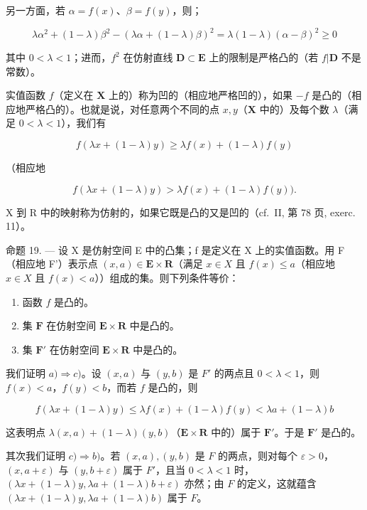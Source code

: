 另一方面，若 \(\alpha = f(x)\)、\(\beta = f(y)\)，则；

\[
\lambda \alpha^ {2} + (1 - \lambda) \beta^ {2} - (\lambda \alpha + (1 - \lambda) \beta) ^ {2} = \lambda (1 - \lambda) (\alpha - \beta) ^ {2} \geqslant 0
\]

其中 \(0 < \lambda < 1\)；进而，\(f^2\) 在仿射直线 \(\mathbf{D} \subset \mathbf{E}\) 上的限制是严格凸的（若 \(f|\mathbf{D}\) 不是常数）。

实值函数 \(f\)（定义在 \(\mathbf{X}\) 上的）称为凹的（相应地严格凹的），如果 \(-f\) 是凸的（相应地严格凸的）。也就是说，对任意两个不同的点 \(x, y\)（\(\mathbf{X}\) 中的）及每个数 \(\lambda\)（满足 \(0 < \lambda < 1\)），我们有

\[
f (\lambda x + (1 - \lambda) y) \geqslant \lambda f (x) + (1 - \lambda) f (y)
\]

（相应地

\[
f (\lambda x + (1 - \lambda) y) > \lambda f (x) + (1 - \lambda) f (y)).
\]

X 到 R 中的映射称为仿射的，如果它既是凸的又是凹的（cf.~II, 第 78 页, exerc. 11）。

命题 19. --- 设 X 是仿射空间 E 中的凸集；f 是定义在 X 上的实值函数。用 F（相应地 F'）表示点 \((x, a) \in \mathbf{E} \times \mathbf{R}\)（满足 \(x \in X\) 且 \(f(x) \leqslant a\)（相应地 \(x \in X\) 且 \(f(x) < a\)））组成的集。则下列条件等价：

\begin{enumerate}
\def\labelenumi{\alph{enumi})}
\item
  函数 \(f\) 是凸的。
\item
  集 \(\mathbf{F}\) 在仿射空间 \(\mathbf{E} \times \mathbf{R}\) 中是凸的。
\item
  集 \(\mathbf{F}'\) 在仿射空间 \(\mathbf{E} \times \mathbf{R}\) 中是凸的。
\end{enumerate}

我们证明 \(a) \Rightarrow c)\)。设 \((x, a)\) 与 \((y, b)\) 是 \(F'\) 的两点且 \(0 < \lambda < 1\)，则 \(f(x) < a\)，\(f(y) < b\)，而若 \(f\) 是凸的，则

\[
f (\lambda x + (1 - \lambda) y) \leqslant \lambda f (x) + (1 - \lambda) f (y) <   \lambda a + (1 - \lambda) b
\]

这表明点 \(\lambda(x, a) + (1 - \lambda)(y, b)\)（\(\mathbf{E} \times \mathbf{R}\) 中的）属于 \(\mathbf{F}'\)。于是 \(\mathbf{F}'\) 是凸的。

其次我们证明 \(c) \Rightarrow b)\)。若 \((x, a), (y, b)\) 是 \(F\) 的两点，则对每个 \(\varepsilon > 0\)，\((x, a + \varepsilon)\) 与 \((y, b + \varepsilon)\) 属于 \(F'\)，且当 \(0 < \lambda < 1\) 时，\((\lambda x + (1 - \lambda)y, \lambda a + (1 - \lambda)b + \varepsilon)\) 亦然；由 \(F\) 的定义，这就蕴含 \((\lambda x + (1 - \lambda)y, \lambda a + (1 - \lambda)b)\) 属于 \(F\)。

